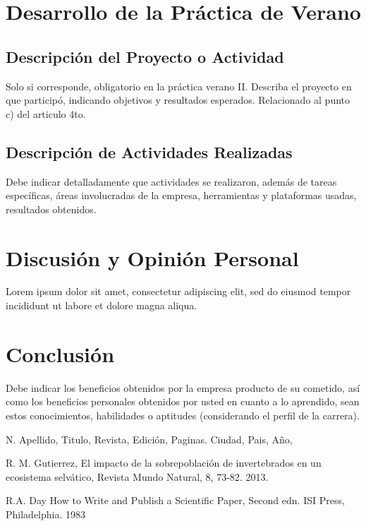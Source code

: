 \documentclass[letter,12pt]{report}
\newcommand\rojo[1]{\textcolor[rgb]{1,0,0}{#1}}
\begin{document}
\chapter{Desarrollo de la Práctica de Verano}

\section{Descripción del Proyecto o Actividad} 

\rojo{Solo si corresponde, obligatorio en la práctica verano II}. Describa el proyecto en que participó, indicando objetivos y resultados esperados. Relacionado al punto c) del articulo 4to.

\section{Descripción de Actividades Realizadas}
Debe indicar detalladamente que actividades se realizaron, además de tareas específicas, áreas involucradas de la empresa, herramientas y plataformas usadas, resultados obtenidos.


\chapter{Discusión y Opinión Personal}
Lorem ipsum dolor sit amet, consectetur adipiscing elit, sed do eiusmod tempor incididunt ut labore et dolore magna aliqua.


\chapter{Conclusión}

Debe indicar los beneficios obtenidos por la empresa producto de su cometido, así como los beneficios personales obtenidos por usted en cuanto a lo aprendido, sean estos conocimientos, habilidades o aptitudes (considerando el perfil de la carrera).

%
%

\begin{thebibliography}{99}
 N. Apellido, Titulo, Revista, Edición, Paginas. Ciudad, Pais, Año,

 R. M. Gutierrez, El impacto de la sobrepoblación de invertebrados en un ecosistema selvático, Revista Mundo Natural, 8, 73-82. 2013.

 R.A. Day How to Write and Publish a Scientific Paper, Second edn. ISI Press, Philadelphia. 1983
\end{thebibliography}  
\end{document}
